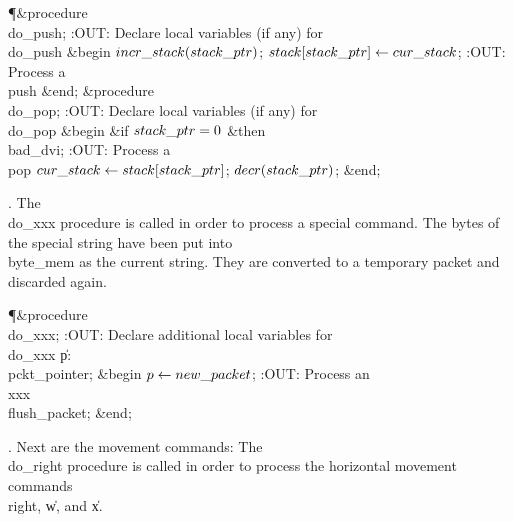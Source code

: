 \Y\P\4\&{procedure}\1\  \\{do\_push};\6
:OUT: Declare local variables (if any) for \\{do\_push}\X\2\6
\&{begin} $\\{incr\_stack}(\\{stack\_ptr})$;\5
$\\{stack}[\\{stack\_ptr}]\gets\\{cur\_stack}$;\6
:OUT: Process a \\{push}\X\6
\&{end};\7
\4\&{procedure}\1\  \\{do\_pop};\6
:OUT: Declare local variables (if any) for \\{do\_pop}\X\2\6
\&{begin} \&{if} $\\{stack\_ptr}=0$ \1\&{then}\5
\\{bad\_dvi};\2\6
:OUT: Process a \\{pop}\X\6
$\\{cur\_stack}\gets\\{stack}[\\{stack\_ptr}]$;\5
$\\{decr}(\\{stack\_ptr})$;\6
\&{end};\par
\fi

. The \\{do\_xxx} procedure is called in order to process a special
command.
The bytes of the special string have been put into \\{byte\_mem} as the
current string. They are converted to a temporary packet and discarded
again.

\Y\P\4\&{procedure}\1\  \\{do\_xxx};\6
:OUT: Declare additional local variables for \\{do\_xxx}\X\6
\4\|p: \\{pckt\_pointer};\2\6
\&{begin} $\hbox{$p$}\gets\\{new\_packet}$;\6
:OUT: Process an \\{xxx}\X\6
\\{flush\_packet};\6
\&{end};\par
\fi

. Next are the movement commands:
The \\{do\_right} procedure is called in order to process the horizontal
movement commands \\{right}, \|w, and \|x.

